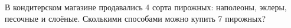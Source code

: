 \question
В кондитерском магазине продавались 4 сорта пирожных: наполеоны, эклеры, песочные и слоёные. Сколькими способами можно купить 7 пирожных?
